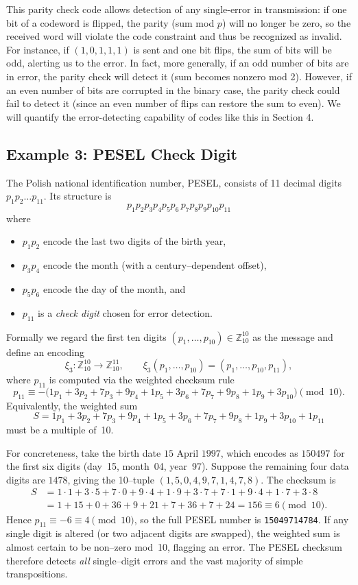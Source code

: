 \documentclass[docmute]{article}
\begin{document}
This parity check code allows detection of any single-error in transmission: if one bit of a codeword is flipped, the parity (sum mod $p$) will no longer be zero, so the received word will violate the code constraint and thus be recognized as invalid. For instance, if $(1,0,1,1,1)$ is sent and one bit flips, the sum of bits will be odd, alerting us to the error. In fact, more generally, if an odd number of bits are in error, the parity check will detect it (sum becomes nonzero mod 2). However, if an even number of bits are corrupted in the binary case, the parity check could fail to detect it (since an even number of flips can restore the sum to even). We will quantify the error-detecting capability of codes like this in Section 4.

\subsection*{Example 3: \textsc{PESEL} Check Digit}
The Polish national identification number, \textsc{PESEL}, consists of 11 decimal digits $p_1p_2\dots p_{11}$.  Its structure is
\[
  p_1p_2p_3p_4p_5p_6\,p_7p_8p_9p_{10}p_{11}
\]
where
\begin{itemize}
  \item $p_1p_2$ encode the last two digits of the birth year,
  \item $p_3p_4$ encode the month (with a century--dependent offset),
  \item $p_5p_6$ encode the day of the month, and
  \item $p_{11}$ is a \emph{check digit} chosen for error detection.
\end{itemize}

Formally we regard the first ten digits $(p_1,\dots,p_{10})\in\mathbb{Z}_{10}^{10}$ as the message and define an encoding
\[
  \xi_3: \mathbb{Z}_{10}^{10}\longrightarrow\mathbb{Z}_{10}^{11},\qquad \xi_3(p_1,\dots,p_{10})=(p_1,\dots,p_{10},p_{11}),
\]
where $p_{11}$ is computed via the weighted checksum rule
\[
  p_{11}\equiv -\bigl(1p_1+3p_2+7p_3+9p_4+1p_5+3p_6+7p_7+9p_8+1p_9+3p_{10}\bigr)\pmod{10}.
\]
Equivalently, the weighted sum
\[
   S=1p_1+3p_2+7p_3+9p_4+1p_5+3p_6+7p_7+9p_8+1p_9+3p_{10}+1p_{11}
\]
must be a multiple of~10.

\medskip

For concreteness, take the birth date $\text{15 April 1997}$, which encodes as $150497$ for the first six digits (day 15, month 04, year 97).  Suppose the remaining four data digits are $1478$, giving the 10--tuple $(1,5,0,4,9,7,1,4,7,8)$.  The checksum is
\[
\begin{aligned}
  S &=1\cdot1+3\cdot5+7\cdot0+9\cdot4+1\cdot9+3\cdot7+7\cdot1+9\cdot4+1\cdot7+3\cdot8\\
    &=1+15+0+36+9+21+7+36+7+24=156\equiv6\pmod{10}.
\end{aligned}
\]
Hence $p_{11}\equiv -6\equiv4\pmod{10}$, so the full PESEL number is \texttt{15049714784}.  If any single digit is altered (or two adjacent digits are swapped), the weighted sum is almost certain to be non--zero mod 10, flagging an error.  The PESEL checksum therefore detects \emph{all} single--digit errors and the vast majority of simple transpositions.
\end{document}
